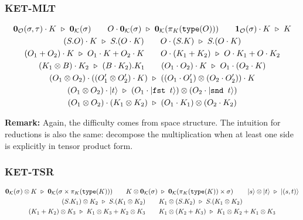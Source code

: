 \documentclass[manuscript, review, timestamp]{acmart}
\newcommand*{\type}{\texttt{type}}
\newcommand*{\fst}{\texttt{fst }}
\newcommand*{\snd}{\texttt{snd }}
\newcommand*{\reduce}{\ \triangleright\ }
\begin{document}
\subsubsection*{\textsf{KET-MLT}}
\begin{gather}
  \textbf{0}_\mathcal{O}(\sigma, \tau) \cdot K \reduce \textbf{0}_\mathcal{K}(\sigma)
  \qquad
  O \cdot \mathbf{0}_{\mathcal{K}}(\sigma) \reduce \mathbf{0}_{\mathcal{K}}(\pi_K(\type(O)))
  \qquad
  \textbf{1}_\mathcal{O}(\sigma) \cdot K \reduce K \notag \\
  (S.O) \cdot K \reduce S.(O \cdot K)
  \qquad
  O \cdot (S.K) \reduce S.(O \cdot K) \notag \\
  (O_1 + O_2) \cdot K \reduce O_1 \cdot K + O_2 \cdot K
  \qquad
  O \cdot (K_1 + K_2) \reduce O \cdot K_1 + O \cdot K_2 \notag \\
  (K_1 \otimes B) \cdot K_2 \reduce (B \cdot K_2).K_1
  \qquad
  (O_1 \cdot O_2) \cdot K \reduce O_1 \cdot (O_2 \cdot K) \label{rule: ketbradiff1} \\
  (O_1 \otimes O_2) \cdot ((O_1' \otimes O_2') \cdot K) \reduce ((O_1 \cdot O_1') \otimes (O_2 \cdot O_2')) \cdot K \label{rule: ketbradiff2} \\
  (O_1 \otimes O_2) \cdot \ket{t} \reduce (O_1 \cdot \ket{\fst t}) \otimes (O_2 \cdot \ket{\snd t}) \notag \\
  (O_1 \otimes O_2) \cdot (K_1 \otimes K_2) \reduce (O_1 \cdot K_1) \otimes (O_2 \cdot K_2) \notag
\end{gather}

\textbf{Remark:} Again, the difficulty comes from space structure. The intuition for reductions is also the same: decompose the multiplication when at least one side is explicitly in tensor product form.


\subsubsection*{\textsf{KET-TSR}}
\begin{gather*}
  \mathbf{0}_\mathcal{K}(\sigma) \otimes K \reduce \mathbf{0}_\mathcal{K}(\sigma \times \pi_K(\type(K)))
  \qquad
  K \otimes \mathbf{0}_\mathcal{K}(\sigma) \reduce \mathbf{0}_\mathcal{K}(\pi_K(\type(K)) \times \sigma)
  \qquad
  \ket{s} \otimes \ket{t}\reduce\ket{(s, t)} \\
  (S.K_1) \otimes K_2 \reduce S.(K_1 \otimes K_2)
  \qquad
  K_1 \otimes (S.K_2) \reduce S.(K_1 \otimes K_2) \\
  (K_1 + K_2) \otimes K_3 \reduce K_1 \otimes K_3 + K_2 \otimes K_3
  \qquad
  K_1 \otimes (K_2 + K_3) \reduce K_1 \otimes K_2 + K_1 \otimes K_3
\end{gather*}
\end{document}

